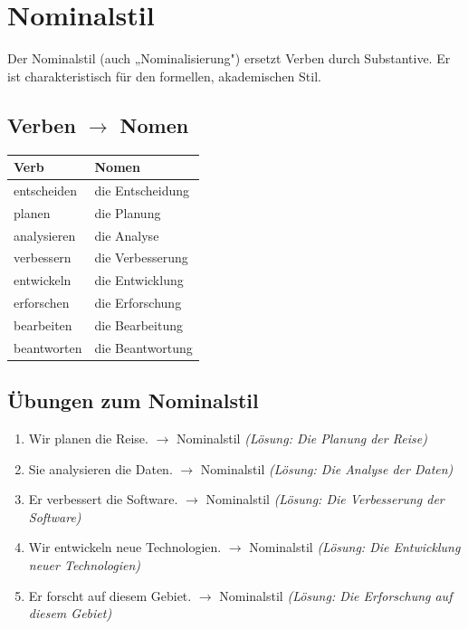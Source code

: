 \chapter{Nominalstil}
\label{cha:Nominalstil}

Der Nominalstil (auch „Nominalisierung") ersetzt Verben durch Substantive. Er ist charakteristisch für den formellen, akademischen Stil.

\section{Verben $\rightarrow$ Nomen}
\label{sec:VerbZuNomen}

\begin{center}
\begin{tabular}{|l|l|}
\hline
\textbf{Verb} & \textbf{Nomen} \\ \hline
entscheiden & die Entscheidung \\ \hline
planen & die Planung \\ \hline
analysieren & die Analyse \\ \hline
verbessern & die Verbesserung \\ \hline
entwickeln & die Entwicklung \\ \hline
erforschen & die Erforschung \\ \hline
bearbeiten & die Bearbeitung \\ \hline
beantworten & die Beantwortung \\ \hline
\end{tabular}
\end{center}

\section{Übungen zum Nominalstil}
\label{sec:NominalstilUebungen}

\begin{enumerate}
    \item Wir planen die Reise. $\rightarrow$ Nominalstil \quad \textit{(Lösung: Die Planung der Reise)}
    \item Sie analysieren die Daten. $\rightarrow$ Nominalstil \quad \textit{(Lösung: Die Analyse der Daten)}
    \item Er verbessert die Software. $\rightarrow$ Nominalstil \quad \textit{(Lösung: Die Verbesserung der Software)}
    \item Wir entwickeln neue Technologien. $\rightarrow$ Nominalstil \quad \textit{(Lösung: Die Entwicklung neuer Technologien)}
    \item Er forscht auf diesem Gebiet. $\rightarrow$ Nominalstil \quad \textit{(Lösung: Die Erforschung auf diesem Gebiet)}
\end{enumerate}

